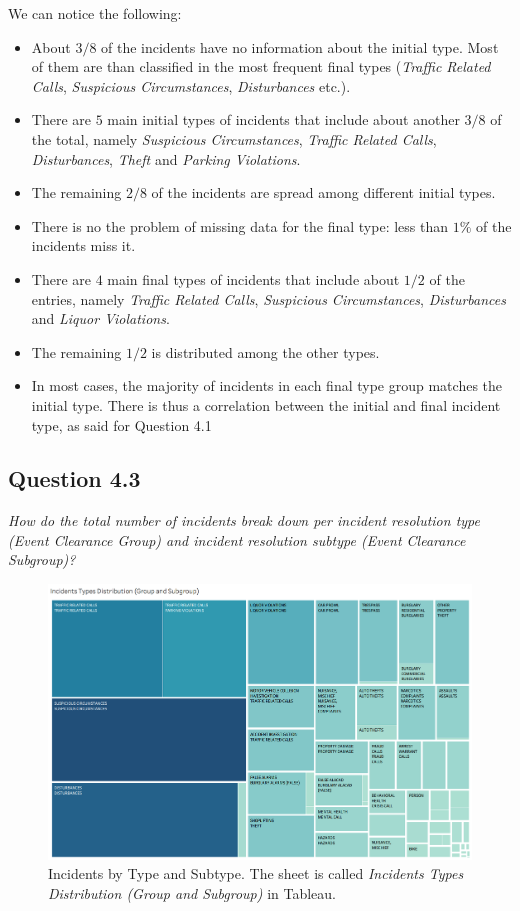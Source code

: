 We can notice the following:
\begin{itemize}
	\item About $3/8$ of the incidents have no information about the initial type. Most of them are than classified in the most frequent final types (\textit{Traffic Related Calls}, \textit{Suspicious Circumstances}, \textit{Disturbances} etc.).
	\item There are $5$ main initial types of incidents that include about another $3/8$ of the total, namely \textit{Suspicious Circumstances}, \textit{Traffic Related Calls}, \textit{Disturbances}, \textit{Theft} and \textit{Parking Violations}.
	\item The remaining $2/8$ of the incidents are spread among different initial types.
	\item There is no the problem of missing data for the final type: less than $1\%$ of the incidents miss it.
	\item There are $4$ main final types of incidents that include about $1/2$ of the entries, namely \textit{Traffic Related Calls}, \textit{Suspicious Circumstances}, \textit{Disturbances} and \textit{Liquor Violations}.
	\item The remaining $1/2$ is distributed among the other types.
	\item In most cases, the majority of incidents in each final type group matches the initial type. There is thus a correlation between the initial and final incident type, as said for Question 4.1
\end{itemize}


\subsection*{Question 4.3}
\textit{How do the total number of incidents break down per incident resolution type (Event Clearance Group) and incident resolution subtype (Event Clearance Subgroup)?}

\begin{figure}[h]
	\centering
	\includegraphics[width=\columnwidth]{figures/4_3_groups_subgroups}
	\caption{Incidents by Type and Subtype. The sheet is called \textit{Incidents Types Distribution (Group and Subgroup)} in Tableau.}
	\label{fig:4_3_groups_subgroups}
\end{figure}

